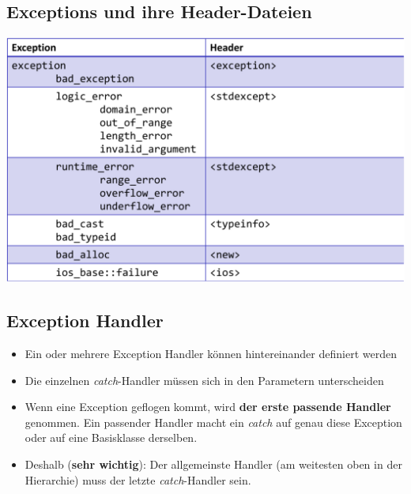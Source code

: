 \begin{multicols}{2}
\subsection{Exceptions und ihre Header-Dateien}
\includegraphics[width=\linewidth]{images/exceptionHeader.png}
\vfill\null
\columnbreak
\subsection{Exception Handler}
\begin{itemize}
	\item Ein oder mehrere Exception Handler können hintereinander definiert werden
	\item Die einzelnen \emph{catch}-Handler müssen sich in den Parametern unterscheiden
	\item Wenn eine Exception geflogen kommt, wird \textbf{der erste passende Handler} genommen. Ein passender Handler macht ein \emph{catch} auf genau diese Exception oder auf eine Basisklasse derselben.
	\item[\-] \begin{achtung}
	Deshalb (\textbf{sehr wichtig}): Der allgemeinste Handler (am weitesten oben in der Hierarchie) muss der letzte \emph{catch}-Handler sein.
	\end{achtung}
\end{itemize}
\end{multicols}

